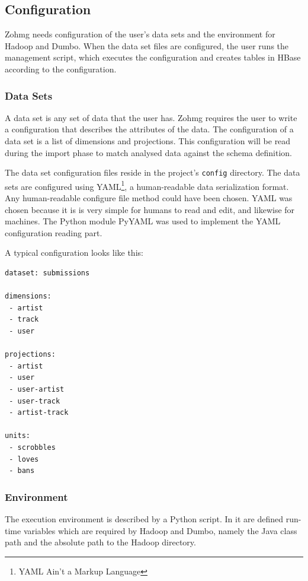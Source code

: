 \subsection*{Configuration}

Zohmg needs configuration of the user's data sets and the environment for Hadoop
and Dumbo. When the data set files are configured, the user runs the management
script, which executes the configuration and creates tables in HBase according
to the configuration.


\subsubsection*{Data Sets}

A data set is any set of data that the user has. Zohmg requires the user to
write a configuration that describes the attributes of the data. The
configuration of a data set is a list of dimensions and projections. This
configuration will be read during the import phase to match analysed data
against the schema definition.

The data set configuration files reside in the project's \texttt{config}
directory. The data sets are configured using YAML\footnote{YAML Ain't a Markup
Language}, a human-readable data serialization format. Any human-readable
configure file method could have been chosen. YAML was chosen because it is is
very simple for humans to read and edit, and likewise for machines. The Python
module PyYAML was used to implement the YAML configuration reading part.
\cite{pyyaml}

A typical configuration looks like this:

\begin{lstlisting}[caption=A data set configuration example.,captionpos=b]
dataset: submissions

dimensions:
 - artist
 - track
 - user

projections:
 - artist
 - user
 - user-artist
 - user-track
 - artist-track

units:
 - scrobbles
 - loves
 - bans
 \end{lstlisting}


\subsubsection*{Environment}

The execution environment is described by a Python script. In it are defined
run-time variables which are required by Hadoop and Dumbo, namely the Java class
path and the absolute path to the Hadoop directory.

